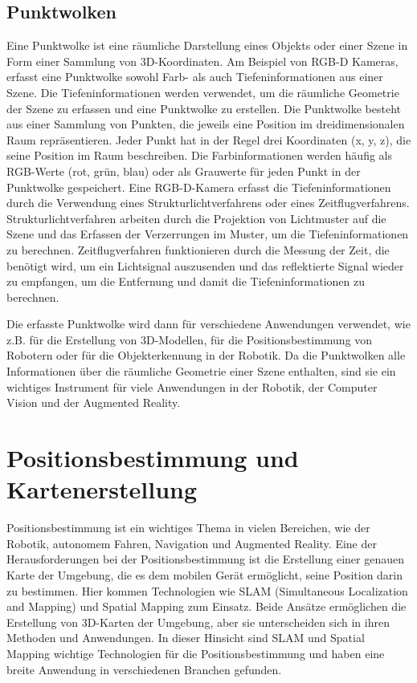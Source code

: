 \subsection{Punktwolken}
Eine Punktwolke ist eine räumliche Darstellung eines Objekts oder einer Szene in Form einer Sammlung von 3D-Koordinaten. Am Beispiel von \ac{RGB-D} Kameras, erfasst eine Punktwolke sowohl Farb- als auch Tiefeninformationen aus einer Szene.
Die Tiefeninformationen werden verwendet, um die räumliche Geometrie der Szene zu erfassen und eine Punktwolke zu erstellen.
Die Punktwolke besteht aus einer Sammlung von Punkten, die jeweils eine Position im dreidimensionalen Raum repräsentieren. Jeder Punkt hat in der Regel drei Koordinaten (x, y, z), die seine Position im Raum beschreiben. Die Farbinformationen werden häufig als RGB-Werte (rot, grün, blau) oder als Grauwerte für jeden Punkt in der Punktwolke gespeichert.
Eine \ac{RGB-D}-Kamera erfasst die Tiefeninformationen durch die Verwendung eines Strukturlichtverfahrens oder eines Zeitflugverfahrens. Strukturlichtverfahren arbeiten durch die Projektion von Lichtmuster auf die Szene und das Erfassen der Verzerrungen im Muster, um die Tiefeninformationen zu berechnen. Zeitflugverfahren funktionieren durch die Messung der Zeit, die benötigt wird, um ein Lichtsignal auszusenden und das reflektierte Signal wieder zu empfangen, um die Entfernung und damit die Tiefeninformationen zu berechnen.

Die erfasste Punktwolke wird dann für verschiedene Anwendungen verwendet, wie z.B. für die Erstellung von 3D-Modellen, für die Positionsbestimmung von Robotern oder für die Objekterkennung in der Robotik. Da die Punktwolken alle Informationen über die räumliche Geometrie einer Szene enthalten, sind sie ein wichtiges Instrument für viele Anwendungen in der Robotik, der Computer Vision und der Augmented Reality.


\section{Positionsbestimmung und Kartenerstellung}
\label{positionsbestimmung:section}
Positionsbestimmung ist ein wichtiges Thema in vielen Bereichen, wie der Robotik, autonomem Fahren, Navigation und Augmented Reality. Eine der Herausforderungen bei der Positionsbestimmung ist die Erstellung einer genauen Karte der Umgebung, die es dem mobilen Gerät ermöglicht, seine Position darin zu bestimmen. Hier kommen Technologien wie SLAM (Simultaneous Localization and Mapping) und Spatial Mapping zum Einsatz. Beide Ansätze ermöglichen die Erstellung von 3D-Karten der Umgebung, aber sie unterscheiden sich in ihren Methoden und Anwendungen. In dieser Hinsicht sind SLAM und Spatial Mapping wichtige Technologien für die Positionsbestimmung und haben eine breite Anwendung in verschiedenen Branchen gefunden.

